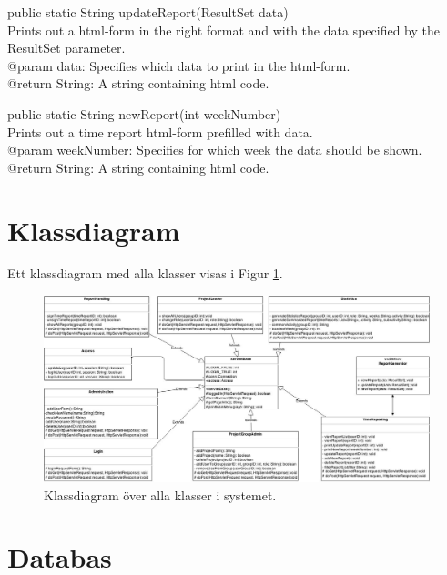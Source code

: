 \documentclass[a4paper]{article}
\begin{document}
\vspace{5mm}
\begin{hangparas}{1.5em}{1}
public static String updateReport(ResultSet data)\\
Prints out a html-form in the right format and with the data specified by the ResultSet parameter.\\ 
@param data: Specifies which data to print in the html-form.\\
@return String: A string containing html code.
\end{hangparas}

\vspace{5mm}
\begin{hangparas}{1.5em}{1}
public static String newReport(int weekNumber)\\
Prints out a time report html-form prefilled with data.\\
@param weekNumber: Specifies for which week the data should be shown.\\
@return String: A string containing html code.\\
\end{hangparas}
 

\section{Klassdiagram}
Ett klassdiagram med alla klasser visas i Figur \ref{umldiagram}.

\begin{figure}[h!]
\centering
\includegraphics[width=140mm]{UML.jpg}
\caption{Klassdiagram över alla klasser i systemet. \label{umldiagram}}
\end{figure}



\section{Databas}
\end{document}
